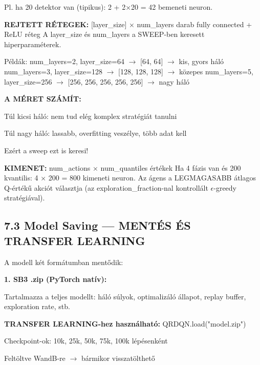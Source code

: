 \documentclass[11pt,a4paper]{article}
\begin{document}
Pl. ha 20 detektor van (tipikus): 2 + 2×20 = 42 bemeneti neuron.

\textbf{REJTETT RÉTEGEK:}
[layer\_size] × num\_layers darab fully connected + ReLU réteg
A layer\_size és num\_layers a SWEEP-ben keresett hiperparaméterek.

Példák:
num\_layers=2, layer\_size=64  $\rightarrow$ [64, 64]     $\rightarrow$ kis, gyors háló
num\_layers=3, layer\_size=128 $\rightarrow$ [128, 128, 128] $\rightarrow$ közepes
num\_layers=5, layer\_size=256 $\rightarrow$ [256, 256, 256, 256, 256] $\rightarrow$ nagy háló

\textbf{A MÉRET SZÁMÍT:}
\par\noindent\hspace*{1em}\textbullet{} Túl kicsi háló: nem tud elég komplex stratégiát tanulni
\par\noindent\hspace*{1em}\textbullet{} Túl nagy háló: lassabb, overfitting veszélye, több adat kell
\par\noindent\hspace*{1em}\textbullet{} Ezért a sweep ezt is keresi!

\textbf{KIMENET:}
num\_actions × num\_quantiles értékek
Ha 4 fázis van és 200 kvantilis: 4 × 200 = 800 kimeneti neuron.
Az ágens a LEGMAGASABB átlagos Q-értékű akciót választja
(az exploration\_fraction-nal kontrollált $\epsilon$-greedy stratégiával).

\subsection*{7.3 Model Saving — MENTÉS ÉS TRANSFER LEARNING}
A modell két formátumban mentődik:

\textbf{1. SB3 .zip (PyTorch natív):}
\par\noindent\hspace*{1em}\textbullet{} Tartalmazza a teljes modellt: háló súlyok, optimalizáló állapot,
replay buffer, exploration rate, stb.
\par\noindent\hspace*{1em}\textbullet{} \textbf{TRANSFER LEARNING-hez használható:} QRDQN.load("model.zip")
\par\noindent\hspace*{1em}\textbullet{} Checkpoint-ok: 10k, 25k, 50k, 75k, 100k lépésenként
\par\noindent\hspace*{1em}\textbullet{} Feltöltve WandB-re $\rightarrow$ bármikor visszatölthető
\end{document}
